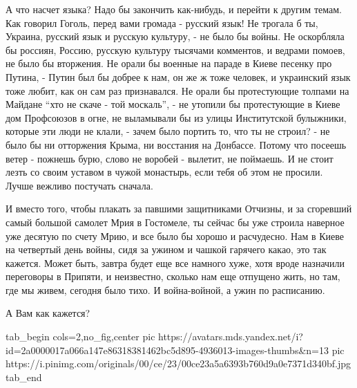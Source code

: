 А что насчет языка? Надо бы закончить как-нибудь, и перейти к другим темам. Как
говорил Гоголь, перед вами громада - русский язык! Не трогала б ты, Украина,
русский язык и русскую культуру, - не было бы войны. Не оскорбляла бы россиян,
Россию, русскую культуру тысячами комментов, и ведрами помоев, не было бы
вторжения. Не орали бы военные на параде в Киеве песенку про Путина, - Путин
был бы добрее к нам, он же ж тоже человек, и украинский язык тоже любит, как он
сам раз признавался. Не орали бы протестующие толпами на Майдане \enquote{хто
не скаче - той москаль}, - не утопили бы протестующие в Киеве дом Профсоюзов в
огне, не выламывали бы из улицы Институтской булыжники, которые эти люди не
клали, - зачем было портить то, что ты не строил? - не было бы ни отторжения
Крыма, ни восстания на Донбассе. Потому что посеешь ветер - пожнешь бурю, слово
не воробей - вылетит, не поймаешь.  И не стоит лезть со своим уставом в чужой
монастырь, если тебя об этом не просили.  Лучше вежливо постучать сначала.

И вместо того, чтобы плакать за павшими защитниками Отчизны, и за сгоревший
самый большой самолет Мрия в Гостомеле, ты сейчас бы уже строила наверное уже
десятую по счету Мрию, и все было бы хорошо и расчудесно. Нам в Киеве на
четвертый день войны, сидя за ужином и чашкой гарячего какао, это так кажется.
Может быть, завтра будет еще все намного хуже, хотя вроде назначили переговоры
в Припяти, и неизвестно, сколько нам еще отпущено жить, но там, где мы живем,
сегодня было тихо. И война-войной, а ужин по расписанию.

А Вам как кажется?

\ifcmt
  tab_begin cols=2,no_fig,center
     pic https://avatars.mds.yandex.net/i?id=2a0000017a066a147e86318381462bc5d895-4936013-images-thumbs&n=13
     pic https://i.pinimg.com/originals/00/ce/23/00ce23a5a6393b760d9a0e7371d340bf.jpg
  tab_end
\fi
